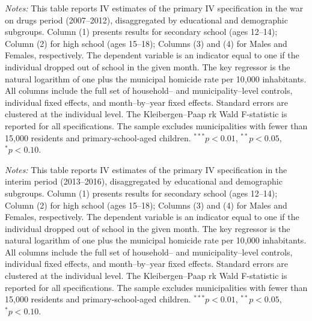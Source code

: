 \documentclass[12pt,letter,english,intoc,bibliography=totoc,index=totoc,BCOR10mm,captions=tableheading,nottitlepage,fleqn]{article}
\theoremstyle{break}
\begin{document}
\begin{table}[H]
\centering
\footnotesize
\caption{Subgroup Estimates: War On Drugs (2007--2012)}
\label{tab:subgroup_war}
\centering
\scriptsize 

\begin{minipage}{0.95\linewidth}
    \scriptsize \singlespacing
    \textit{Notes:} This table reports IV estimates of the primary IV specification in the war on drugs period (2007--2012), disaggregated by educational and demographic subgroups. Column (1) presents results for secondary school (ages 12--14); Column (2) for high school (ages 15--18); Columns (3) and (4) for Males and Females, respectively. The dependent variable is an indicator equal to one if the individual dropped out of school in the given month. The key regressor is the natural logarithm of one plus the municipal homicide rate per 10{,}000 inhabitants. All columns include the full set of household-- and municipality--level controls, individual fixed effects, and month--by--year fixed effects. Standard errors are clustered at the individual level. The Kleibergen--Paap rk Wald F-statistic is reported for all specifications. The sample excludes municipalities with fewer than 15{,}000 residents and primary-school-aged children.
 $^{***}p<0.01$, $^{**}p<0.05$, $^{*}p<0.10$.
    \end{minipage}
\end{table}

\begin{table}[H]
\centering
\caption{Subgroup Estimates: Interim Period (2013--2016)}
\label{tab:subgroup_interim}
\centering
\scriptsize 

\begin{minipage}{0.95\linewidth}
    \scriptsize \singlespacing
    \textit{Notes:} This table reports IV estimates of the primary IV specification in the interim period (2013--2016), disaggregated by educational and demographic subgroups. Column (1) presents results for secondary school (ages 12--14); Column (2) for high school (ages 15--18); Columns (3) and (4) for Males and Females, respectively. The dependent variable is an indicator equal to one if the individual dropped out of school in the given month. The key regressor is the natural logarithm of one plus the municipal homicide rate per 10{,}000 inhabitants. All columns include the full set of household-- and municipality--level controls, individual fixed effects, and month--by--year fixed effects. Standard errors are clustered at the individual level. The Kleibergen--Paap rk Wald F-statistic is reported for all specifications. The sample excludes municipalities with fewer than 15{,}000 residents and primary-school-aged children.
 $^{***}p<0.01$, $^{**}p<0.05$, $^{*}p<0.10$.
    \end{minipage}
\end{table}
\end{document}
